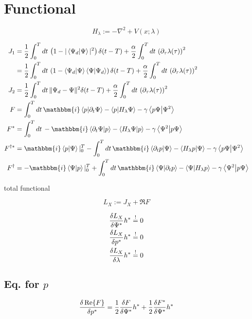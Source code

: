 \documentclass[10pt,a4paper]{article}
\newcommand{\iu}{\ensuremath{\mathbbm{i}}}
\newcommand{\intT}{\ensuremath{\int_0^T dt\,}}
\newcommand{\skalarprodukt}[2]{\left< #1 \vert #2 \right>}
\newcommand{\Hlam}{\ensuremath{H_{\lambda}}}
\begin{document}
\section{Functional}

\begin{equation}
\Hlam := -\nabla^2 + V(x;\lambda)
\end{equation}

\begin{align}
J_1 &= \frac{1}{2} \intT \left( 1 - \vert\skalarprodukt{\Psi_d}{\Psi}\vert^2 \right) \delta(t-T) + \frac{\alpha}{2} \intT \left( \partial_{\tau} \lambda(\tau) \right)^2 \\
&= \frac{1}{2} \intT \left( 1 - \braket{\Psi_d}{\Psi}\braket{\Psi}{\Psi_d} \right) \delta(t-T) + \frac{\alpha}{2} \intT \left( \partial_{\tau} \lambda(\tau) \right)^2 \\
J_2 &= \frac{1}{2} \intT \Vert\Psi_d-\Psi\Vert^2 \delta(t-T) + \frac{\alpha}{2} \intT \left( \partial_{\tau} \lambda(\tau) \right)^2 \\
F &= \intT \iu \braket{p}{\partial_t\Psi} - \braket{p}{\Hlam\Psi} - \gamma \braket{p \Psi}{\Psi^2} \\
F^* &= \intT -\iu \braket{\partial_t\Psi}{p} - \braket{\Hlam\Psi}{p} - \gamma \braket{\Psi^2}{p \Psi} \\
F^{\dagger *} &= \iu \braket{p}{\Psi}\vert_{0}^{T} - \intT \iu \braket{\partial_t p}{\Psi} - \braket{\Hlam p}{\Psi} - \gamma \braket{p \Psi}{\Psi^2} \\
F^{\dagger} &= -\iu \braket{\Psi}{p}\vert_{0}^{T} + \intT \iu \braket{\Psi}{\partial_t p} - \braket{\Psi}{\Hlam p} - \gamma \braket{\Psi^2}{p \Psi}
\end{align}

total functional

\begin{equation}
L_X := J_X + \Re{F}
\end{equation}

\begin{align}
\fdv{L_X}{\Psi^*} h^* &\stackrel{!}{=} 0 \\
\fdv{L_X}{p^*} h^* &\stackrel{!}{=} 0 \\
\fdv{L_X}{\lambda} h^* &\stackrel{!}{=} 0 
\end{align}

\subsection{Eq. for $p$}

\begin{equation}
\fdv{\Re{F}}{p^*} = \frac{1}{2} \fdv{F}{\Psi^*} h^* + \frac{1}{2} \fdv{F^*}{\Psi^*} h^*
\end{equation}
\end{document}
